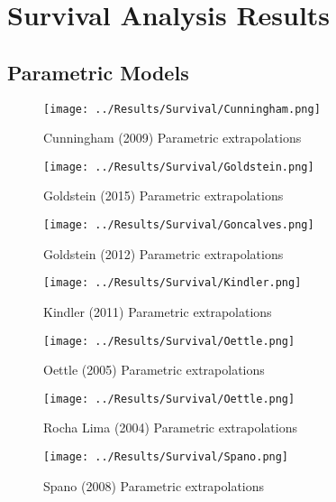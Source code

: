 \chapter{Survival Analysis Results}

\section{Parametric Models}

\begin{figure}
    \texttt{[image: ../Results/Survival/Cunningham.png]}
    \caption{Cunningham (2009) Parametric extrapolations}
    \label{fig:cunninghamParamExtrap}
\end{figure}

\begin{figure}
    \texttt{[image: ../Results/Survival/Goldstein.png]}
    \caption{Goldstein (2015) Parametric extrapolations}
    \label{fig:goldsteinParamExtrap}
\end{figure}

\begin{figure}
    \texttt{[image: ../Results/Survival/Goncalves.png]}
    \caption{Goldstein (2012) Parametric extrapolations}
    \label{fig:goncalvesParamExtrap}
\end{figure}

\begin{figure}
    \texttt{[image: ../Results/Survival/Kindler.png]}
    \caption{Kindler (2011) Parametric extrapolations}
    \label{fig:kindlerParamExtrap}
\end{figure}

\begin{figure}
    \texttt{[image: ../Results/Survival/Oettle.png]}
    \caption{Oettle (2005) Parametric extrapolations}
    \label{fig:oettleParamExtrap}
\end{figure}

\begin{figure}
    \texttt{[image: ../Results/Survival/Oettle.png]}
    \caption{Rocha Lima (2004) Parametric extrapolations}
    \label{fig:rochaLimaParamExtrap}
\end{figure}

\begin{figure}
    \texttt{[image: ../Results/Survival/Spano.png]}
    \caption{Spano (2008) Parametric extrapolations}
    \label{fig:spanoParamExtrap}
\end{figure}